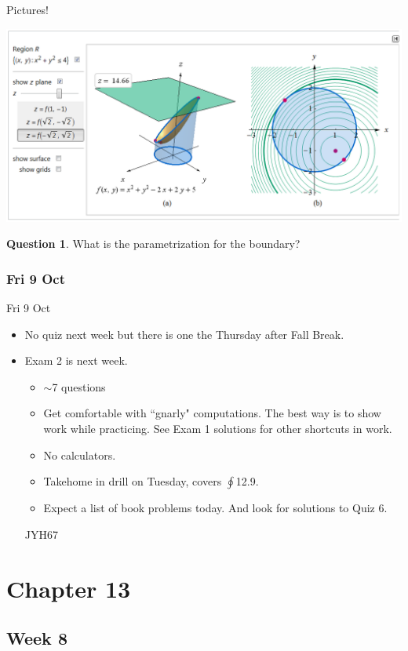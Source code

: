 \documentclass[12pt]{beamer}
\theoremstyle{plain}
\theoremstyle{definition}
\newtheorem{que}{Question}
\begin{document}
\begin{frame}[allowframebreaks]{\small Pictures!}
%
\framebreak
\begin{center}\tiny
\includegraphics[scale=0.3]{12-8bounded}
\begin{que} What is the parametrization for the boundary? \end{que}
\end{center}
\end{frame}%
\subsubsection{Fri 9 Oct}
\begin{frame}{Fri 9 Oct}%
\begin{itemize}
\item No quiz next week but there is one the Thursday after Fall Break.
\item Exam 2 is next week.
	\begin{itemize}
	\item $\sim$7 questions
	\item Get comfortable with ``gnarly" computations.  The best way is to show work while practicing.  See Exam 1 solutions for other shortcuts in work.
	\item No calculators.  
	\item Takehome in drill on Tuesday, covers $\textstyle\oint$12.9.
	\item Expect a list of book problems today.  And look for solutions to Quiz 6.
	\end{itemize}JYH67
\end{itemize}
\end{frame}

\section{Chapter 13}
\subsection{Week 8}
\end{document}
